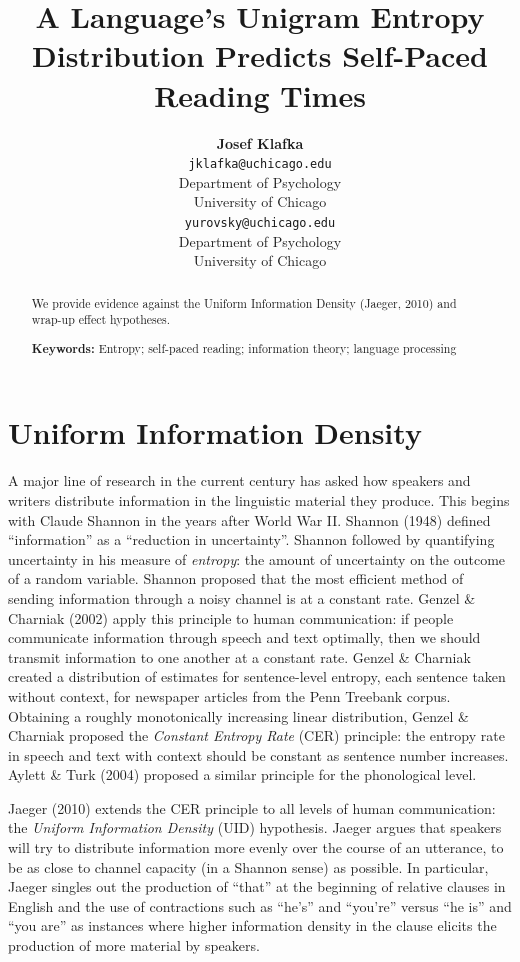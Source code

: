 \documentclass[10pt, letterpaper]{article}
\title{A Language's Unigram Entropy Distribution Predicts Self-Paced Reading
Times}
\author{{\large \bf Josef Klafka} \\ \texttt{jklafka@uchicago.edu} \\ Department of Psychology \\ University of Chicago \And {\large \bf Daniel Yurovsky} \\ \texttt{yurovsky@uchicago.edu} \\ Department of Psychology \\ University of Chicago}
\begin{document}
\maketitle

\begin{abstract}
We provide evidence against the Uniform Information Density (Jaeger,
2010) and wrap-up effect hypotheses.

\textbf{Keywords:}
Entropy; self-paced reading; information theory; language processing
\end{abstract}

\section{Uniform Information Density}\label{uniform-information-density}

A major line of research in the current century has asked how speakers
and writers distribute information in the linguistic material they
produce. This begins with Claude Shannon in the years after World War
II. Shannon (1948) defined ``information'' as a ``reduction in
uncertainty''. Shannon followed by quantifying uncertainty in his
measure of \emph{entropy}: the amount of uncertainty on the outcome of a
random variable. Shannon proposed that the most efficient method of
sending information through a noisy channel is at a constant rate.
Genzel \& Charniak (2002) apply this principle to human communication:
if people communicate information through speech and text optimally,
then we should transmit information to one another at a constant rate.
Genzel \& Charniak created a distribution of estimates for
sentence-level entropy, each sentence taken without context, for
newspaper articles from the Penn Treebank corpus. Obtaining a roughly
monotonically increasing linear distribution, Genzel \& Charniak
proposed the \emph{Constant Entropy Rate} (CER) principle: the entropy
rate in speech and text with context should be constant as sentence
number increases. Aylett \& Turk (2004) proposed a similar principle for
the phonological level.

Jaeger (2010) extends the CER principle to all levels of human
communication: the \emph{Uniform Information Density} (UID) hypothesis.
Jaeger argues that speakers will try to distribute information more
evenly over the course of an utterance, to be as close to channel
capacity (in a Shannon sense) as possible. In particular, Jaeger singles
out the production of ``that'' at the beginning of relative clauses in
English and the use of contractions such as ``he's'' and ``you're''
versus ``he is'' and ``you are'' as instances where higher information
density in the clause elicits the production of more material by
speakers.
\end{document}
